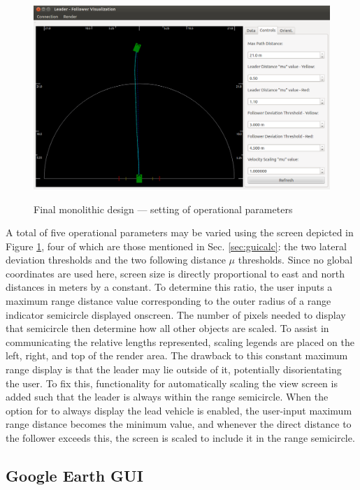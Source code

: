 \documentclass[12pt]{report}
\begin{document}
\begin{figure}[ht] \centering \label{fig:finaldesopts}
    \includegraphics[width=5in]{./figs/final_design_opts.png}
    \caption{Final monolithic design --- setting of operational parameters }
\end{figure}

A total of five operational parameters may be varied using the screen depicted in Figure \ref{fig:finaldesopts}, four of which are those mentioned in Sec. \ref{sec:guicalc}: the two lateral deviation thresholds and the two following distance $\mu$ thresholds. Since no global coordinates are used here, screen size is directly proportional to east and north distances in meters by a constant. To determine this ratio, the user inputs a maximum range distance value corresponding to the outer radius of a range indicator semicircle displayed onscreen. The number of pixels needed to display that semicircle then determine how all other objects are scaled. To assist in communicating the relative lengths represented, scaling legends are placed on the left, right, and top of the render area. The drawback to this constant maximum range display is that the leader may lie outside of it, potentially disorientating the user. To fix this, functionality for automatically scaling the view screen is added such that the leader is always within the range semicircle. When the option for to always display the lead vehicle is enabled, the user-input maximum range distance becomes the minimum value, and whenever the direct distance to the follower exceeds this, the screen is scaled to include it in the range semicircle.

\subsection{Google Earth GUI} \label{sec:finaldes_earth}
\end{document}
